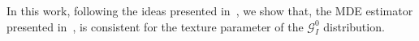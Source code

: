\documentclass[journal]{IEEEtran}
\newtheorem{definition}{Definition}
\numberwithin{equation}{section}
\newtheorem{theorem}{Theorem}[section]
\begin{document}
In this work, following the ideas presented in~\cite{parr1982},  we show that, the MDE estimator presented in~\cite{gambini2015}, is consistent for the texture parameter of the $\mathcal{G}_I^{0}$ distribution. 
%
%
\end{document}
